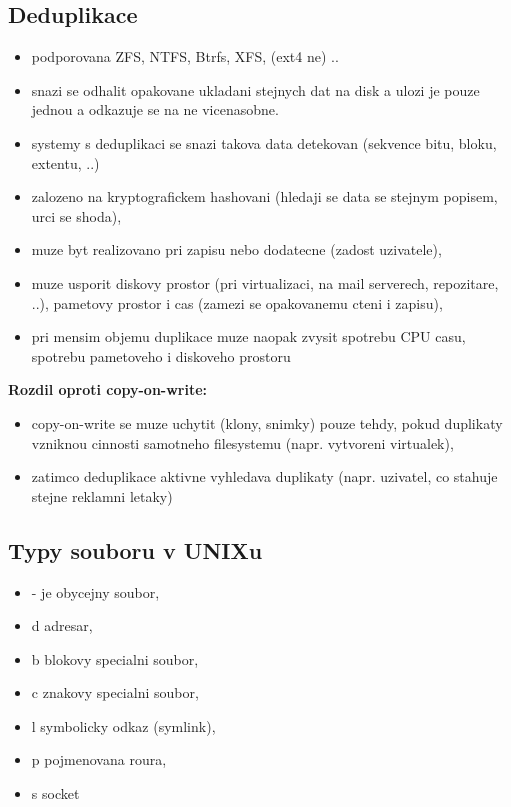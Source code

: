\documentclass[a4paper, 11pt]{article}
\begin{document}
\newpage

\subsection{Deduplikace}
\begin{itemize}
    \item podporovana ZFS, NTFS, Btrfs, XFS, (ext4 ne) ..
    \item snazi se odhalit opakovane ukladani stejnych dat na disk a ulozi je pouze jednou a odkazuje se na ne vicenasobne.
    \item systemy s deduplikaci se snazi takova data detekovan (sekvence bitu, bloku, extentu, ..)
    \item zalozeno na kryptografickem hashovani (hledaji se data se stejnym popisem, urci se shoda),
    \item muze byt realizovano pri zapisu nebo dodatecne (zadost uzivatele),
    \item muze usporit diskovy prostor (pri virtualizaci, na mail serverech, repozitare, ..), pametovy prostor i cas (zamezi se opakovanemu cteni i zapisu),
    \item pri mensim objemu duplikace muze naopak zvysit spotrebu CPU casu, spotrebu pametoveho i diskoveho prostoru \\
\end{itemize}

\textbf{Rozdil oproti copy-on-write:}
\begin{itemize}
    \item copy-on-write se muze uchytit (klony, snimky) pouze tehdy, pokud duplikaty vzniknou cinnosti samotneho filesystemu (napr. vytvoreni virtualek),
    \item zatimco deduplikace aktivne vyhledava duplikaty (napr. uzivatel, co stahuje stejne reklamni letaky) \\
\end{itemize}

\subsection{Typy souboru v UNIXu}
\begin{itemize}
    \item - je obycejny soubor,
    \item d adresar,
    \item b blokovy specialni soubor,
    \item c znakovy specialni soubor,
    \item l symbolicky odkaz (symlink),
    \item p pojmenovana roura,
    \item s socket \\
\end{itemize}
\end{document}
